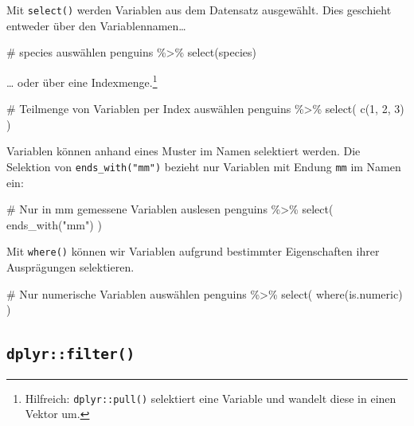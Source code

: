 \documentclass[
  a4paper,
  DIV=11,
  oneside]{scrreprt}
\newenvironment{Shaded}{\begin{snugshade}}{\end{snugshade}}
\newcommand{\NormalTok}[1]{\textcolor[rgb]{0.00,0.23,0.31}{#1}}
\begin{document}
Mit \texttt{select()} werden Variablen aus dem Datensatz ausgewählt.
Dies geschieht entweder über den Variablennamen\ldots{}

\begin{Shaded}
\begin{Highlighting}[]
\NormalTok{\# \textquotesingle{}species\textquotesingle{} auswählen}
\NormalTok{penguins \%\textgreater{}\% }
\NormalTok{  select(species)}
\end{Highlighting}
\end{Shaded}

\ldots{} oder über eine Indexmenge.\footnote{Hilfreich:
  \texttt{dplyr::pull()} selektiert eine Variable und wandelt diese in
  einen Vektor um.}

\begin{Shaded}
\begin{Highlighting}[]
\NormalTok{\# Teilmenge von Variablen per Index auswählen}
\NormalTok{penguins \%\textgreater{}\% }
\NormalTok{  select(}
\NormalTok{    c(1, 2, 3)}
\NormalTok{  )}
\end{Highlighting}
\end{Shaded}

Variablen können anhand eines Muster im Namen selektiert werden. Die
Selektion von \texttt{ends\_with("mm")} bezieht nur Variablen mit Endung
\texttt{mm} im Namen ein:

\begin{Shaded}
\begin{Highlighting}[]
\NormalTok{\# Nur in mm gemessene Variablen auslesen}
\NormalTok{penguins \%\textgreater{}\% }
\NormalTok{  select(}
\NormalTok{    ends\_with("mm")}
\NormalTok{  )}
\end{Highlighting}
\end{Shaded}

Mit \texttt{where()} können wir Variablen aufgrund bestimmter
Eigenschaften ihrer Ausprägungen selektieren.

\begin{Shaded}
\begin{Highlighting}[]
\NormalTok{\# Nur numerische Variablen auswählen}
\NormalTok{penguins \%\textgreater{}\% }
\NormalTok{  select(}
\NormalTok{    where(is.numeric)}
\NormalTok{  )}
\end{Highlighting}
\end{Shaded}

\hypertarget{dplyrfilter}{%
\subsection{\texorpdfstring{\texttt{dplyr::filter()}}{dplyr::filter()}}\label{dplyrfilter}}
\end{document}

